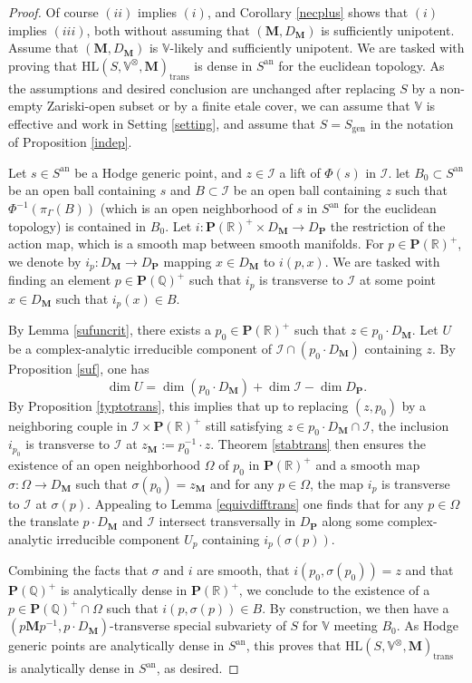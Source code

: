 \documentclass[10pt]{article}
\numberwithin{equation}{subsection}
\theoremstyle{plain}
\theoremstyle{definition}
\theoremstyle{remark}
\newcommand{\I}{\mathscr{I}}
\newcommand{\Q}{\mathbb Q}
\newcommand{\R}{\mathbb R}
\newcommand{\V}{\mathbb V}
\newcommand{\pp}{\mathbf P}
\newcommand{\M}{\mathbf M}
\newcommand{\HLM}{\mathrm{HL}(S, \V^\otimes, \M)}
\newcommand{\an}{\mathrm{an}}
\newcommand{\trans}{\mathrm{trans}}
\newcommand{\gen}{\mathrm{gen}}
\begin{document}
\begin{proof}
Of course $(ii)$ implies $(i)$, and Corollary \ref{necplus} shows that $(i)$ implies $(iii)$, both without assuming that $(\M,D_\M)$ is sufficiently unipotent. Assume that $(\M,D_\M)$ is $\V$-likely and sufficiently unipotent. We are tasked with proving that  $\HLM_\trans$ is dense in $S^\an$ for the euclidean topology. As the assumptions and desired conclusion are unchanged after replacing $S$ by a non-empty Zariski-open subset or by a finite etale cover, we can assume that $\V$ is effective and work in Setting \ref{setting}, and assume that $S = S_\gen$ in the notation of Proposition \ref{indep}.  

Let $s \in S^\an$ be a Hodge generic point, and $z \in \I$ a lift of $\Phi(s)$ in $\I$. let $B_0 \subset S^\an$ be an open ball containing $s$ and $B \subset \I$ be an open ball containing $z$ such that $\Phi^{-1}(\pi_\Gamma(B))$ (which is an open neighborhood of $s$ in $S^\an$ for the euclidean topology) is contained in $B_0$. Let $i : \pp(\R)^+ \times D_\M \rightarrow D_\pp$ the restriction of the action map, which is a smooth map between smooth manifolds. For $p \in \pp(\R)^+$, we denote by $i_p : D_\M \rightarrow D_\pp$ mapping $x \in D_\M$ to $i(p,x)$. We are tasked with finding an element $p \in \pp(\Q)^+$ such that $i_p$ is transverse to $\I$ at some point $x \in D_\M$ such that $i_p(x) \in B$. 

By Lemma \ref{sufuncrit}, there exists a $p_0 \in \pp(\R)^+$ such that $z \in p_0 \cdot D_\M$. Let $U$ be a complex-analytic irreducible component of $\I \cap (p_0 \cdot D_\M)$ containing $z$. By Proposition \ref{suf}, one has
\begin{equation}\label{eqdim}
\dim U = \dim (p_0 \cdot D_\M) + \dim \I - \dim D_\pp.
\end{equation}
By Proposition \ref{typtotrans}, this implies that up to replacing $(z, p_0)$ by a neighboring couple in $\I \times \pp(\R)^+$ still satisfying $z \in p_0 \cdot D_\M \cap \I$, the inclusion $i_{p_0}$ is transverse to $\I$ at $z_\M := p_0^{-1} \cdot z$. Theorem \ref{stabtrans} then ensures the existence of an open neighborhood $\Omega$ of $p_0$ in $\pp(\R)^+$ and a smooth map $\sigma : \Omega \rightarrow D_\M$ such that $\sigma(p_0) = z_\M$ and for any $p \in \Omega$, the map $i_p$ is transverse to $\I$ at $\sigma(p)$. Appealing to Lemma \ref{equivdifftrans} one finds that for any $p \in \Omega$ the translate $p \cdot D_\M$ and $\I$ intersect transversally in $D_\pp$ along some complex-analytic irreducible component $U_p$ containing $i_p(\sigma(p))$.

Combining the facts that $\sigma$ and $i$ are smooth, that $i(p_0,\sigma(p_0)) = z$ and that $\pp(\Q)^+$ is analytically dense in $\pp(\R)^+$, we conclude to the existence of a $p \in \pp(\Q)^+ \cap \Omega$ such that $i(p, \sigma(p)) \in B$. By construction, we then have a $(p \M p^{-1}, p \cdot D_\M)$-transverse special subvariety of $S$ for $\V$ meeting $B_0$. As Hodge generic points are analytically dense in $S^\an$, this proves that $\HLM_\trans$ is analytically dense in $S^\an$, as desired.
\end{proof}
\end{document}
